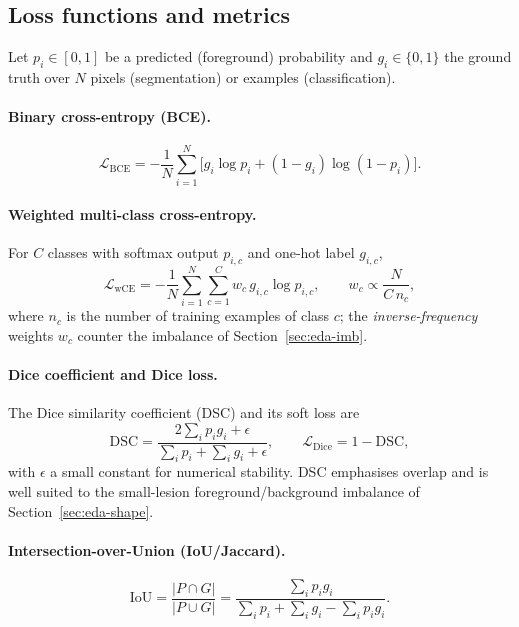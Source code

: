 \documentclass[11pt]{article}
\begin{document}
\subsection{Loss functions and metrics}
\label{sec:losses}
Let $p_i\in[0,1]$ be a predicted (foreground) probability and $g_i\in\{0,1\}$ the
ground truth over $N$ pixels (segmentation) or examples (classification).

\paragraph{Binary cross-entropy (BCE).}
\begin{equation}
\mathcal{L}_{\mathrm{BCE}} = -\frac{1}{N}\sum_{i=1}^{N}\Big[g_i\log p_i + (1-g_i)\log(1-p_i)\Big].
\end{equation}

\paragraph{Weighted multi-class cross-entropy.}
For $C$ classes with softmax output $p_{i,c}$ and one-hot label $g_{i,c}$,
\begin{equation}
\mathcal{L}_{\mathrm{wCE}} = -\frac{1}{N}\sum_{i=1}^{N}\sum_{c=1}^{C} w_c\, g_{i,c}\log p_{i,c},
\qquad w_c \propto \frac{N}{C\,n_c},
\end{equation}
where $n_c$ is the number of training examples of class $c$; the
\emph{inverse-frequency} weights $w_c$ counter the imbalance of
Section~\ref{sec:eda-imb}.

\paragraph{Dice coefficient and Dice loss.}
The Dice similarity coefficient (DSC) and its soft loss are
\begin{equation}
\mathrm{DSC} = \frac{2\sum_i p_i g_i + \epsilon}{\sum_i p_i + \sum_i g_i + \epsilon},
\qquad
\mathcal{L}_{\mathrm{Dice}} = 1-\mathrm{DSC},
\end{equation}
with $\epsilon$ a small constant for numerical stability. DSC emphasises overlap
and is well suited to the small-lesion foreground/background imbalance of
Section~\ref{sec:eda-shape}.

\paragraph{Intersection-over-Union (IoU/Jaccard).}
\begin{equation}
\mathrm{IoU} = \frac{|P\cap G|}{|P\cup G|} = \frac{\sum_i p_i g_i}{\sum_i p_i + \sum_i g_i - \sum_i p_i g_i}.
\end{equation}
\end{document}

